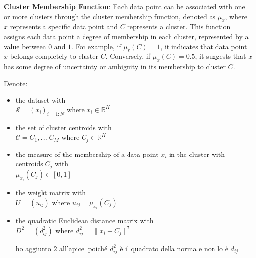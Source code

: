 \noindent \textbf{Cluster Membership Function}: Each data point can be associated with one or more clusters through the cluster membership function, denoted as $\mu_x$, where $x$ represents a specific data point and $C$ represents a cluster. This function assigns each data point a degree of membership in each cluster, represented by a value between $0$ and $1$. For example, if $\mu_x(C) = 1$, it indicates that data point $x$ belongs completely to cluster $C$. Conversely, if $\mu_x(C) = 0.5$, it suggests that $x$ has some degree of uncertainty or ambiguity in its membership to cluster $C$.
\begin{notation}
Denote:
\begin{itemize}
\item the dataset with \\ $\mathcal{S} = (x_i)_{i=1:N}$ where $x_i\in\mathbb{R}^K$
\item the set of cluster centroids with \\ $\mathcal{C}={C_1,\dots,C_M}$ where $C_j\in\mathbb{R}^K$
\item \begin{toReview}the measure of the membership of a data point $x_i$ in the cluster with centroids $C_j$ with \\ $\mu_{x_i}(C_j)\in\left[0,1\right]$
\end{toReview}
\item the weight matrix with \\ $U=(u_{ij})$ where $u_{ij}=\mu_{x_i}(C_j)$
\item the quadratic Euclidean distance matrix with \\ $D^2=(d^2_{ij})$ where $d_{ij}^2=\|x_i-C_j\|^2$
\begin{note}
	ho aggiunto $2$ all'apice, poiché $d_{ij}^2$ è il quadrato della norma e non lo è $d_{ij}$
\end{note}
\end{itemize}
\end{notation}

